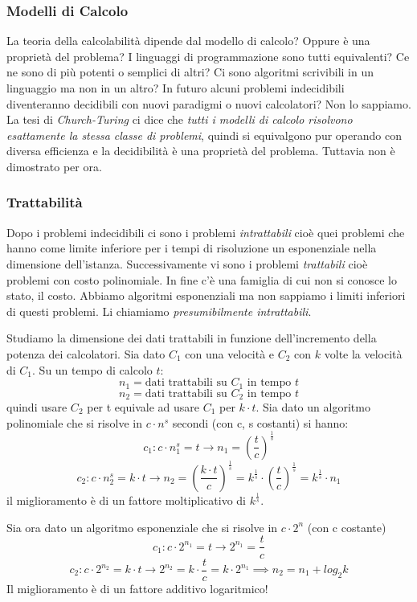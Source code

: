 \subsubsection{Modelli di Calcolo}
La teoria della calcolabilità dipende dal modello di calcolo? Oppure è una proprietà del problema? I linguaggi di programmazione sono tutti equivalenti? Ce ne sono di più potenti o semplici di altri? Ci sono algoritmi scrivibili in un linguaggio ma non in un altro? In futuro alcuni problemi indecidibili diventeranno decidibili con nuovi paradigmi o nuovi calcolatori? Non lo sappiamo. La tesi di \emph{Church-Turing} ci dice che \emph{tutti i modelli di calcolo risolvono esattamente la stessa classe di problemi}, quindi si equivalgono pur operando con diversa efficienza e la decidibilità è una proprietà del problema. Tuttavia non è dimostrato per ora.

\subsubsection{Trattabilità}
Dopo i problemi indecidibili ci sono i problemi \emph{intrattabili} cioè quei problemi che hanno come limite inferiore per i tempi di risoluzione un esponenziale nella dimensione dell'istanza. Successivamente vi sono i problemi \emph{trattabili} cioè problemi con costo polinomiale. In fine c'è una famiglia di cui non si conosce lo stato, il costo. Abbiamo algoritmi esponenziali ma non sappiamo i limiti inferiori di questi problemi. Li chiamiamo \emph{presumibilmente intrattabili}.

Studiamo la dimensione dei dati trattabili in funzione dell'incremento della potenza dei calcolatori. Sia dato $C_{1}$ con una velocità e $C_{2}$ con $k$ volte la velocità di $C_{1}$. Su un tempo di calcolo $t$:
$$ n_{1} = \text{dati trattabili su $C_{1}$ in tempo $t$} $$
$$ n_{2} = \text{dati trattabili su $C_{2}$ in tempo $t$} $$
quindi usare $C_{2}$ per t equivale ad usare $C_{1}$ per $k \cdot t$.
Sia dato un algoritmo polinomiale che si risolve in $c \cdot n^{s}$ secondi (con c, s costanti) si hanno:
$$ c_{1}: c \cdot n_{1}^{s} = t \longrightarrow n_{1} = \left( \frac{t}{c} \right)^{\frac{1}{s}} $$
$$ c_{2}: c \cdot n_{2}^{s} = k \cdot t \longrightarrow n_{2} = \left(\frac{k \cdot t}{c}\right)^{\frac{1}{s}} = k^{\frac{1}{s}} \cdot \left( \frac{t}{c} \right) ^{\frac{1}{s}} = k^{\frac{1}{s}} \cdot n_{1} $$
il miglioramento è di un fattore moltiplicativo di $k^{\frac{1}{s}}$.

Sia ora dato un algoritmo esponenziale che si risolve in $c \cdot 2^n$ (con c costante)
$$ c_{1}: c \cdot 2^{n_{1}} = t \longrightarrow 2^{n_1} = \frac{t}{c} $$
$$ c_{2}: c \cdot 2^{n_{2}} = k \cdot t \longrightarrow 2^{n_2} = k \cdot \frac{t}{c} = k \cdot 2^{n_1} \implies n_2 = n_1 + log_{2}k $$
Il miglioramento è di un fattore additivo logaritmico!

